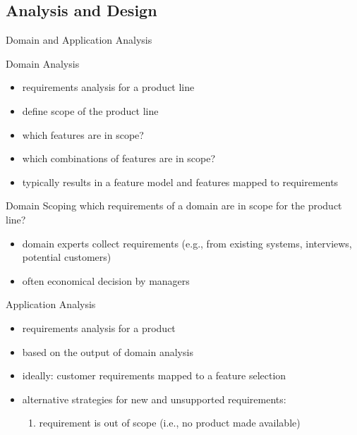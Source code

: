 \subsection{Analysis and Design}
\begin{frame}{Domain and Application Analysis}\small
	\begin{mycolumns}[T,columns=3,widths={10}]
		\renewcommand{\projectcartoonwidth}{1}
	\mynextcolumn
		\begin{definition}{Domain Analysis}
			\begin{itemize}
				\item requirements analysis for a product line
				\item define scope of the product line
				\item which features are in scope?
				\item which combinations of features are in scope?
				\item typically results in a feature model and features mapped to requirements
			\end{itemize}
		\end{definition}
		\begin{definition}{Domain Scoping}
			which requirements of a domain are in scope for the product line?
			\begin{itemize}
				\item domain experts collect requirements (e.g., from existing systems, interviews, potential customers)
				\item often economical decision by managers
			\end{itemize}
		\end{definition}
	\mynextcolumn
		\begin{definition}{Application Analysis}
			\begin{itemize}
				\item requirements analysis for a product
				\item based on the output of domain analysis
				\item ideally: customer requirements mapped to a feature selection
				\item alternative strategies for new and unsupported requirements:
					\begin{enumerate}\small %
						\item requirement is out of scope (i.e., no product made available)

\end{enumerate}
\end{itemize}
\end{definition}
\end{mycolumns}
\end{frame}
